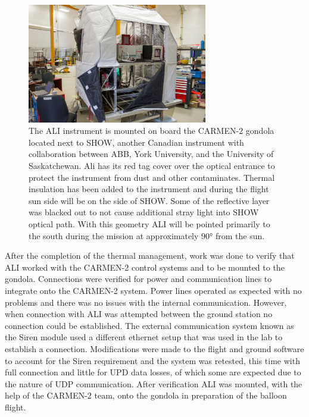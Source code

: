  \begin{figure}
    \includegraphics[trim={900 800 500 0},clip,width=0.7\textwidth]{./Images/5-1-AliIntegratedOnCarmen.jpg}
    \caption[ALI Mounted onto the CARMEN-2 Gondola]{The ALI instrument is mounted on board the CARMEN-2 gondola located next to SHOW, another Canadian instrument with collaboration between ABB, York University, and the University of Saskatchewan. Ali has its red tag cover over the optical entrance to protect the instrument from dust and other contaminates. Thermal insulation has been added to the instrument and during the flight sun side will be on the side of SHOW. Some of the reflective layer was blacked out to not cause additional stray light into SHOW optical path. With this geometry ALI will be pointed primarily to the south during the mission at approximately 90\si{\degree} from the sun.}
    \label{fig:5.1:aliIntigratedOnCarmen}
\end{figure}

After the completion of the thermal management, work was done to verify that ALI worked with the CARMEN-2 control systems and to be mounted to the gondola. Connections were verified for power and communication lines to integrate onto the CARMEN-2 system. Power lines operated as expected with no problems and there was no issues with the internal communication. However, when connection with ALI was attempted between the ground station no connection could be established. The external communication system known as the Siren module used a different ethernet setup that was used in the lab to establish a connection. Modifications were made to the flight and ground software to account for the Siren requirement and the system was retested, this time with full connection and little for UPD data losses, of which some are expected due to the nature of UDP communication. After verification ALI was mounted, with the help of the CARMEN-2 team, onto the gondola in preparation of the balloon flight.


